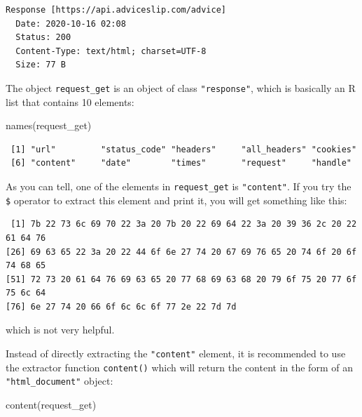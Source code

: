 \documentclass[
]{book}
\newenvironment{Shaded}{\begin{snugshade}}{\end{snugshade}}
\newcommand{\FunctionTok}[1]{\textcolor[rgb]{0.00,0.00,0.00}{#1}}
\newcommand{\NormalTok}[1]{#1}
\newcommand{\SpecialCharTok}[1]{\textcolor[rgb]{0.00,0.00,0.00}{#1}}
\begin{document}
\begin{verbatim}
Response [https://api.adviceslip.com/advice]
  Date: 2020-10-16 02:08
  Status: 200
  Content-Type: text/html; charset=UTF-8
  Size: 77 B
\end{verbatim}

The object \texttt{request\_get} is an object of class \texttt{"response"}, which is basically
an R list that contains 10 elements:

\begin{Shaded}
\begin{Highlighting}[]
\FunctionTok{names}\NormalTok{(request\_get)}
\end{Highlighting}
\end{Shaded}

\begin{verbatim}
 [1] "url"         "status_code" "headers"     "all_headers" "cookies"    
 [6] "content"     "date"        "times"       "request"     "handle"
\end{verbatim}

As you can tell, one of the elements in \texttt{request\_get} is \texttt{"content"}. If you
try the \texttt{\$} operator to extract this element and print it, you will get
something like this:

\begin{Shaded}
\end{Shaded}

\begin{verbatim}
 [1] 7b 22 73 6c 69 70 22 3a 20 7b 20 22 69 64 22 3a 20 39 36 2c 20 22 61 64 76
[26] 69 63 65 22 3a 20 22 44 6f 6e 27 74 20 67 69 76 65 20 74 6f 20 6f 74 68 65
[51] 72 73 20 61 64 76 69 63 65 20 77 68 69 63 68 20 79 6f 75 20 77 6f 75 6c 64
[76] 6e 27 74 20 66 6f 6c 6c 6f 77 2e 22 7d 7d
\end{verbatim}

which is not very helpful.

Instead of directly extracting the \texttt{"content"} element, it is recommended to
use the extractor function \texttt{content()} which will return the content in the
form of an \texttt{"html\_document"} object:

\begin{Shaded}
\begin{Highlighting}[]
\FunctionTok{content}\NormalTok{(request\_get)}
\end{Highlighting}
\end{Shaded}
\end{document}
